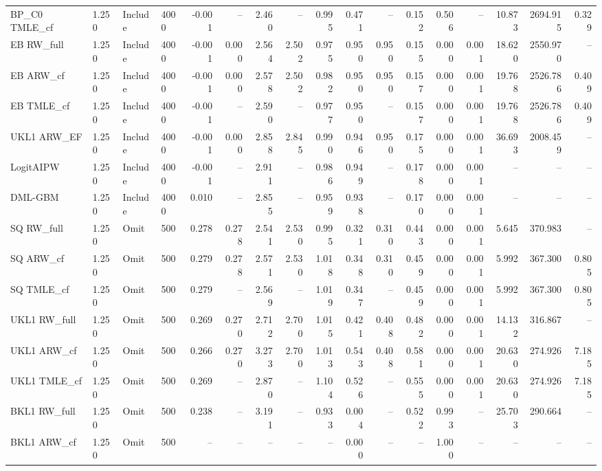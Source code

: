 \begin{tabular}{llllrrrrrrrrrrrrr}
BP\_C0 TMLE\_cf & 1.250 & Include & 4000 & -0.001 & -- & 2.460 & -- & 0.995 & 0.471 & -- & 0.152 & 0.506 & -- & 10.873 & 2694.915 & 0.329 \\
EB RW\_full & 1.250 & Include & 4000 & -0.001 & 0.000 & 2.564 & 2.502 & 0.975 & 0.950 & 0.950 & 0.155 & 0.000 & 0.001 & 18.620 & 2550.970 & -- \\
EB ARW\_cf & 1.250 & Include & 4000 & -0.001 & 0.000 & 2.578 & 2.502 & 0.982 & 0.950 & 0.950 & 0.157 & 0.000 & 0.001 & 19.768 & 2526.786 & 0.409 \\
EB TMLE\_cf & 1.250 & Include & 4000 & -0.001 & -- & 2.590 & -- & 0.977 & 0.950 & -- & 0.157 & 0.000 & 0.001 & 19.768 & 2526.786 & 0.409 \\
UKL1 ARW\_EF & 1.250 & Include & 4000 & -0.001 & 0.000 & 2.858 & 2.845 & 0.990 & 0.946 & 0.950 & 0.175 & 0.000 & 0.001 & 36.693 & 2008.459 & -- \\
LogitAIPW & 1.250 & Include & 4000 & -0.001 & -- & 2.911 & -- & 0.986 & 0.949 & -- & 0.178 & 0.000 & 0.001 & -- & -- & -- \\
DML-GBM & 1.250 & Include & 4000 & 0.010 & -- & 2.855 & -- & 0.959 & 0.938 & -- & 0.170 & 0.000 & 0.001 & -- & -- & -- \\
SQ RW\_full & 1.250 & Omit & 500 & 0.278 & 0.278 & 2.541 & 2.530 & 0.995 & 0.321 & 0.310 & 0.443 & 0.000 & 0.001 & 5.645 & 370.983 & -- \\
SQ ARW\_cf & 1.250 & Omit & 500 & 0.279 & 0.278 & 2.571 & 2.530 & 1.018 & 0.348 & 0.310 & 0.459 & 0.000 & 0.001 & 5.992 & 367.300 & 0.805 \\
SQ TMLE\_cf & 1.250 & Omit & 500 & 0.279 & -- & 2.569 & -- & 1.019 & 0.347 & -- & 0.459 & 0.000 & 0.001 & 5.992 & 367.300 & 0.805 \\
UKL1 RW\_full & 1.250 & Omit & 500 & 0.269 & 0.270 & 2.712 & 2.700 & 1.015 & 0.421 & 0.408 & 0.482 & 0.000 & 0.001 & 14.132 & 316.867 & -- \\
UKL1 ARW\_cf & 1.250 & Omit & 500 & 0.266 & 0.270 & 3.273 & 2.700 & 1.013 & 0.543 & 0.408 & 0.581 & 0.000 & 0.001 & 20.630 & 274.926 & 7.185 \\
UKL1 TMLE\_cf & 1.250 & Omit & 500 & 0.269 & -- & 2.870 & -- & 1.104 & 0.526 & -- & 0.555 & 0.000 & 0.001 & 20.630 & 274.926 & 7.185 \\
BKL1 RW\_full & 1.250 & Omit & 500 & 0.238 & -- & 3.191 & -- & 0.933 & 0.004 & -- & 0.522 & 0.993 & -- & 25.703 & 290.664 & -- \\
BKL1 ARW\_cf & 1.250 & Omit & 500 & -- & -- & -- & -- & -- & 0.000 & -- & -- & 1.000 & -- & -- & -- & -- \\

\end{tabular}
